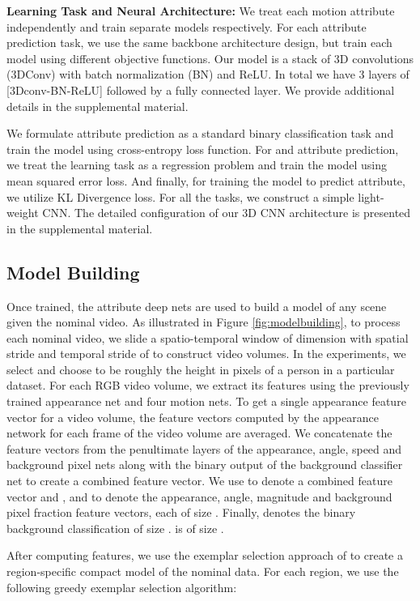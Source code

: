 \textbf{Learning Task and Neural Architecture:} We treat each motion attribute independently and train separate models respectively. For each attribute prediction task, we use the same backbone architecture design, but train each model using different objective functions. Our model is a stack of 3D convolutions (3DConv) with batch normalization (BN) and ReLU. In total we have 3 layers of [3Dconv-BN-ReLU] followed by a fully connected layer. We provide additional details in the supplemental material.

We formulate  attribute prediction as a standard binary classification task and train the model using cross-entropy loss function. For  and  attribute prediction, we treat the learning task as a regression problem and train the model using mean squared error loss. And finally, for training the model to predict  attribute, we utilize KL Divergence loss. For all the tasks, we construct a simple light-weight CNN. The detailed configuration of our 3D CNN architecture is presented in the supplemental material.
\subsection{Model Building}

Once trained, the attribute deep nets are used to build a model of any scene given the nominal video. As illustrated in Figure \ref{fig:modelbuilding}, to process each nominal video, we slide a spatio-temporal window of dimension  with spatial stride  and temporal stride of  to construct video volumes.  In the experiments, we select  and choose  to be roughly the height in pixels of a person in a particular dataset.  For each RGB video volume, we extract its features using the previously trained appearance net and four motion nets. To get a single appearance feature vector for a video volume, the feature vectors computed by the appearance network for each frame of the video volume are averaged.
We concatenate the feature vectors from the penultimate layers of the appearance, angle, speed and background pixel nets along with the binary output of the background classifier net to create a combined feature vector.
We use  to denote a combined feature vector and , and  to denote the appearance, angle, magnitude and background pixel fraction feature vectors, each of size . Finally,  denotes the binary background classification of size .   is of size .

After computing features, we use the exemplar selection approach of \cite{jones2016exemplar, ramachandra2020learning} to create a region-specific compact model of the nominal data. For each region, we use the following greedy exemplar selection algorithm:

